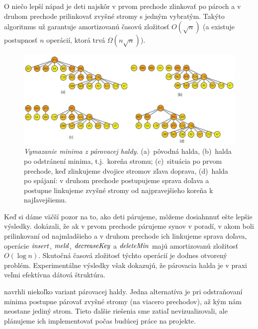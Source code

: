 O niečo lepší nápad je deti najskôr v prvom prechode zlinkovať po pároch
a v druhom prechode prilinkovať zvyšné stromy s jedným vybratým.
Takýto algoritmus už garantuje amortizovanú časovú zložitosť $O(\sqrt{n})$
(a existuje postupnosť $n$ operácií, ktorá trvá $\Omega(n\sqrt{n})$).

\begin{figure}
\centering
\includegraphics[width=2\columnwidth]{obrazky/pairdel.png}
\caption{\emph{Vymazanie minima z párovacej haldy.} 
(a)~pôvodná halda, (b)~halda po odstránení minima, t.j.\ koreňa stromu; (c)~situácia po prvom
prechode, keď zlinkujeme dvojice stromov zľava doprava, (d)~halda po spájaní: v druhom
prechode postupujeme sprava doľava a postupne linkujeme zvyšné stromy od najpravejšieho koreňa k najľavejšiemu.} 
\label{img:pairdel} 
\end{figure}

Keď si dáme väčší pozor na to, ako deti párujeme, môžeme dosiahnnuť ešte lepšie 
výsledky. \citet{pairing} dokázali, že ak v prvom prechode párujeme synov v poradí,
v akom boli prilinkovaní od najmladšieho a v druhom prechode ich linkujeme sprava doľava,
operácie $\mathop{\mathit{insert}}$, $\mathop{\mathit{meld}}$, $\mathop{\mathit{decreaseKey}}$ a $\mathop{\mathit{deleteMin}}$ majú amortizovanú zložitosť $O(\log n)$.
Skutočná časová zložitosť týchto operácií je dodnes otvorený problém. 
Experimentálne výsledky \citep{moret91,pettie02} však dokazujú, že párovacia halda
je v praxi veľmi efektívna dátová štruktúra.

\citet{pairing} navrhli niekoľko variant párovacej haldy. Jedna alternatíva je pri odstraňovaní minima
postupne párovať zvyšné stromy (na viacero prechodov), až kým nám neostane jediný strom.
Tieto ďalšie riešenia sme zatiaľ nevizualizovali, ale plánujeme ich implementovať počas budúcej práce na projekte.


